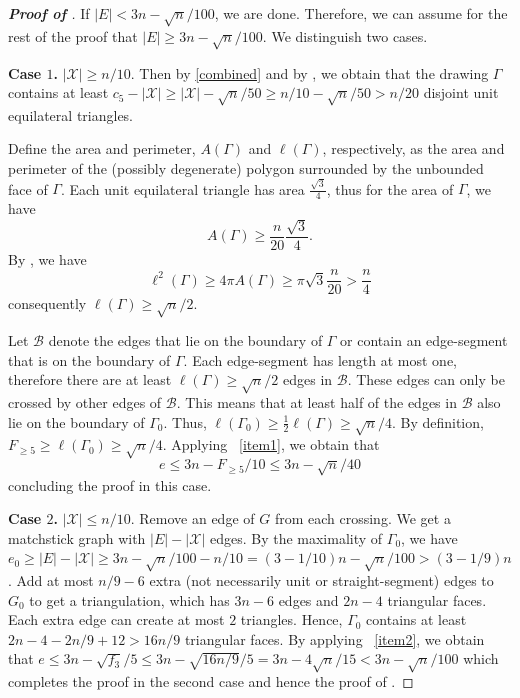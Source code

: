 \documentclass[10pt]{article}
\theoremstyle{definition}
\begin{document}
\begin{proof}[\bf Proof of ]
If $|E| < 3n - \sqrt{n}/100$, we are done.  Therefore, we can assume for the rest of the proof that $|E| \ge 3n - \sqrt{n}/100$.
We distinguish two cases.
\medskip


\textbf{Case $1$.} $|\mathcal{X}|\ge n/10$. Then by \eqref{combined} 
and by , we obtain that 
the drawing $\Gamma$ contains at least 
$c_5-|\mathcal{X}|\geq 
|\mathcal{X}|-\sqrt{n}/50\geq n/10-\sqrt{n}/50>n/20$
disjoint unit equilateral triangles.

Define the area and perimeter, $A(\Gamma)$ and $\ell(\Gamma)$, respectively, 
as the area and perimeter of the (possibly degenerate) polygon 
surrounded by the unbounded face of $\Gamma$. Each unit equilateral 
triangle has area $\frac{\sqrt3}{4}$, thus for the area of $\Gamma$, we have 
$$A(\Gamma)\geq \frac{n}{20}\frac{\sqrt{3}}{4}.$$
By , we have
$$\ell^2(\Gamma)\geq4\pi A(\Gamma)\geq  \pi\sqrt{3}\frac{n}{20}>\frac{n}{4}$$   
consequently $\ell(\Gamma)\ge \sqrt{n}/2$.


Let $\mathcal{B}$ denote the edges that lie on the boundary of $\Gamma$ 
or contain an edge-segment that is on the boundary of $\Gamma$.
Each edge-segment has length at most one, therefore there are 
at least $\ell(\Gamma)\ge \sqrt{n}/2$ edges in $\mathcal{B}$. 
These edges can only be crossed by other edges of $\mathcal{B}$. 
This means that at least half of the edges in $\mathcal{B}$ 
also lie on the boundary of $\Gamma_0$. 
Thus, $\ell(\Gamma_0)\geq \frac12\ell(\Gamma)\ge \sqrt{n}/4$. 
By definition, $F_{\geq5}\geq \ell(\Gamma_0)\ge \sqrt{n}/4$. 
Applying ~\ref{item1}, 
we obtain that 
$$e\leq 3n-F_{\geq5}/10\leq 3n-\sqrt{n}/40$$
concluding the proof in this case.



\medskip


\textbf{Case $2$.} $|\mathcal{X}|\le n/10$.
Remove an edge of $G$ from each crossing. 
We get a matchstick graph with $|E|-|\mathcal{X}|$ edges. 
By the maximality of $\Gamma_0$, we have $e_0\ge |E|-|\mathcal{X}|\ge 3n-\sqrt{n}/100-n/10=(3-1/10)n-\sqrt{n}/100>(3-1/9)n$.
Add at most $n/9-6$ extra (not necessarily unit or straight-segment) 
edges to $G_0$ to get a triangulation, which has 
$3n-6$ edges and $2n-4$ triangular faces. Each extra edge can create at most $2$ triangles. 
Hence, $\Gamma_0$ contains at least
$2n-4-2n/9+12>16n/9$
triangular faces. 
By applying ~\ref{item2}, 
we obtain that
$e\le 3n-\sqrt{f_3}/5\le 3n-\sqrt{16n/9}/5=3n-4\sqrt{n}/15<3n-\sqrt{n}/100$
which completes the proof in the second case and hence the proof of .
\end{proof}
\end{document}
